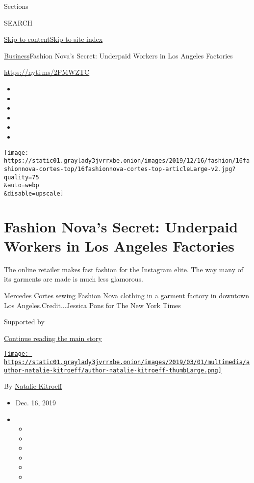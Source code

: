 Sections

SEARCH

\protect\hyperlink{site-content}{Skip to
content}\protect\hyperlink{site-index}{Skip to site index}

\href{/section/business}{Business}\textbar{}Fashion Nova's Secret:
Underpaid Workers in Los Angeles Factories

\url{https://nyti.ms/2PMWZTC}

\begin{itemize}
\item
\item
\item
\item
\item
\item
\end{itemize}

\texttt{[image: https://static01.graylady3jvrrxbe.onion/images/2019/12/16/fashion/16fashionnova-cortes-top/16fashionnova-cortes-top-articleLarge-v2.jpg?quality=75\\\&auto=webp\\\&disable=upscale]}

\hypertarget{fashion-novas-secret-underpaid-workers-in-los-angeles-factories}{%
\section{Fashion Nova's Secret: Underpaid Workers in Los Angeles
Factories}\label{fashion-novas-secret-underpaid-workers-in-los-angeles-factories}}

The online retailer makes fast fashion for the Instagram elite. The way
many of its garments are made is much less glamorous.

Mercedes Cortes sewing Fashion Nova clothing in a garment factory in
downtown Los Angeles.Credit...Jessica Pons for The New York Times

Supported by

\protect\hyperlink{after-sponsor}{Continue reading the main story}

\href{https://www.nytimes3xbfgragh.onion/by/natalie-kitroeff}{\texttt{[image: https://static01.graylady3jvrrxbe.onion/images/2019/03/01/multimedia/author-natalie-kitroeff/author-natalie-kitroeff-thumbLarge.png]}}

By \href{https://www.nytimes3xbfgragh.onion/by/natalie-kitroeff}{Natalie
Kitroeff}

\begin{itemize}
\item
  Dec. 16, 2019
\item
  \begin{itemize}
  \item
  \item
  \item
  \item
  \item
  \item
  \end{itemize}
\end{itemize}

